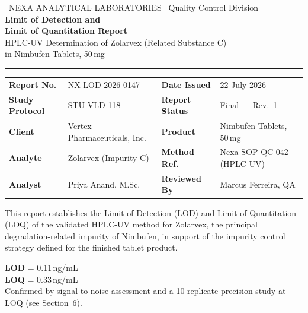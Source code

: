 
\begin{center}
{\color{nexagray}\small \faFlask\ NEXA ANALYTICAL LABORATORIES \textbar\ Quality Control Division}\\[6pt]
{\Huge\bfseries\color{nexanavy} Limit of Detection and\\[2pt] Limit of Quantitation Report}\\[8pt]
{\large\color{nexateal} HPLC-UV Determination of Zolarvex (Related Substance C)\\ in Nimbufen Tablets, 50\,mg}
\end{center}

\vspace{6pt}
\noindent\textcolor{nexateal}{\rule{\linewidth}{1.2pt}}
\vspace{6pt}

\begin{tabularx}{\linewidth}{@{}l X l X@{}}
\textbf{Report No.} & NX-LOD-2026-0147 & \textbf{Date Issued} & 22 July 2026 \\
\textbf{Study Protocol} & STU-VLD-118 & \textbf{Report Status} & Final --- Rev.\ 1 \\
\textbf{Client} & Vertex Pharmaceuticals, Inc. & \textbf{Product} & Nimbufen Tablets, 50\,mg \\
\textbf{Analyte} & Zolarvex (Impurity C) & \textbf{Method Ref.} & Nexa SOP QC-042 (HPLC-UV) \\
\textbf{Analyst} & Priya Anand, M.Sc. & \textbf{Reviewed By} & Marcus Ferreira, QA \\
\end{tabularx}

\vspace{8pt}

\noindent
\begin{minipage}[t]{0.48\linewidth}
\begin{tcolorbox}[infobox, title={\faVial\ Study Purpose}]
\footnotesize
This report establishes the Limit of Detection (LOD) and Limit of Quantitation (LOQ) of
the validated HPLC-UV method for Zolarvex, the principal degradation-related impurity
of Nimbufen, in support of the impurity control strategy defined for the finished
tablet product.
\end{tcolorbox}
\end{minipage}\hfill
\begin{minipage}[t]{0.48\linewidth}
\begin{tcolorbox}[resultbox, title={\faCheckCircle\ Headline Result}]
\footnotesize
\textbf{LOD} = 0.11\,ng/mL\\
\textbf{LOQ} = 0.33\,ng/mL\\
Confirmed by signal-to-noise assessment and a 10-replicate precision study at LOQ
(see Section~6).
\end{tcolorbox}
\end{minipage}
\par

